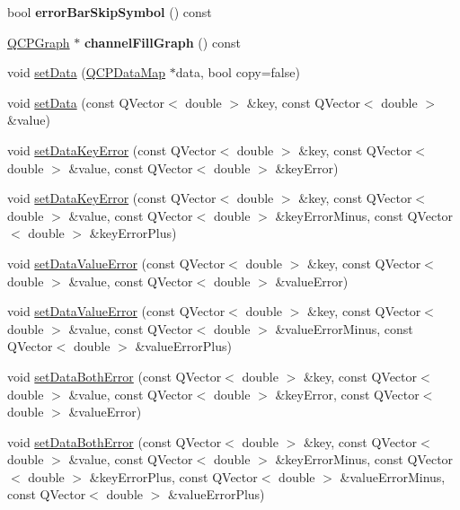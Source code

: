 \begin{DoxyCompactItemize}
\item 
\hypertarget{classQCPGraph_a04dbc050ff04561658ab1e7f3df37a01}{bool {\bfseries error\-Bar\-Skip\-Symbol} () const }\label{classQCPGraph_a04dbc050ff04561658ab1e7f3df37a01}

\item 
\hypertarget{classQCPGraph_a5369f23863e04a6164f8b66d49fd18f4}{\hyperlink{classQCPGraph}{Q\-C\-P\-Graph} $\ast$ {\bfseries channel\-Fill\-Graph} () const }\label{classQCPGraph_a5369f23863e04a6164f8b66d49fd18f4}

\item 
void \hyperlink{classQCPGraph_a1df2fd710545c8ba3b2c99a39a27bf8b}{set\-Data} (\hyperlink{qcustomplot_8h_a84a9c4a4c2216ccfdcb5f3067cda76e3}{Q\-C\-P\-Data\-Map} $\ast$data, bool copy=false)
\item 
void \hyperlink{classQCPGraph_a4c55d8ac13bfa42c8c93747820891a76}{set\-Data} (const Q\-Vector$<$ double $>$ \&key, const Q\-Vector$<$ double $>$ \&value)
\item 
void \hyperlink{classQCPGraph_abce9f07c0d722bc3e4fa7bd73c7e5dfa}{set\-Data\-Key\-Error} (const Q\-Vector$<$ double $>$ \&key, const Q\-Vector$<$ double $>$ \&value, const Q\-Vector$<$ double $>$ \&key\-Error)
\item 
void \hyperlink{classQCPGraph_ac15c749c5fedf740d5692c6fe67143b8}{set\-Data\-Key\-Error} (const Q\-Vector$<$ double $>$ \&key, const Q\-Vector$<$ double $>$ \&value, const Q\-Vector$<$ double $>$ \&key\-Error\-Minus, const Q\-Vector$<$ double $>$ \&key\-Error\-Plus)
\item 
void \hyperlink{classQCPGraph_acba6296eadcb36b93267628b8dae3de5}{set\-Data\-Value\-Error} (const Q\-Vector$<$ double $>$ \&key, const Q\-Vector$<$ double $>$ \&value, const Q\-Vector$<$ double $>$ \&value\-Error)
\item 
void \hyperlink{classQCPGraph_a3afbfd7222d739351c69387904776f93}{set\-Data\-Value\-Error} (const Q\-Vector$<$ double $>$ \&key, const Q\-Vector$<$ double $>$ \&value, const Q\-Vector$<$ double $>$ \&value\-Error\-Minus, const Q\-Vector$<$ double $>$ \&value\-Error\-Plus)
\item 
void \hyperlink{classQCPGraph_a873fe46bdb20be5710428e474ade8908}{set\-Data\-Both\-Error} (const Q\-Vector$<$ double $>$ \&key, const Q\-Vector$<$ double $>$ \&value, const Q\-Vector$<$ double $>$ \&key\-Error, const Q\-Vector$<$ double $>$ \&value\-Error)
\item 
void \hyperlink{classQCPGraph_abb75736ecdbf6e6a7501e1da64fb18cf}{set\-Data\-Both\-Error} (const Q\-Vector$<$ double $>$ \&key, const Q\-Vector$<$ double $>$ \&value, const Q\-Vector$<$ double $>$ \&key\-Error\-Minus, const Q\-Vector$<$ double $>$ \&key\-Error\-Plus, const Q\-Vector$<$ double $>$ \&value\-Error\-Minus, const Q\-Vector$<$ double $>$ \&value\-Error\-Plus)

\end{DoxyCompactItemize}

